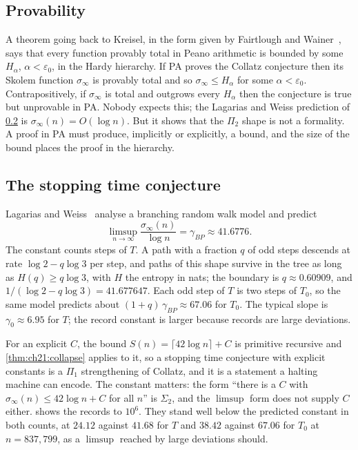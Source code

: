 \subsection{Provability}

A theorem going back to Kreisel, in the form given by Fairtlough and Wainer~\cite{fairtlough1998}, says that every function provably total in Peano arithmetic is bounded by some $H_\alpha$, $\alpha<\varepsilon_0$, in the Hardy hierarchy. If PA proves the Collatz conjecture then its Skolem function $\sigma_\infty$ is provably total and so $\sigma_\infty\le H_\alpha$ for some $\alpha<\varepsilon_0$. Contrapositively, if $\sigma_\infty$ is total and outgrows every $H_\alpha$ then the conjecture is true but unprovable in PA. Nobody expects this; the Lagarias and Weiss prediction of \cref{sec:ch21:stopping} is $\sigma_\infty(n)=O(\log n)$. But it shows that the $\Pi_2$ shape is not a formality. A proof in PA must produce, implicitly or explicitly, a bound, and the size of the bound places the proof in the hierarchy.

\subsection{The stopping time conjecture}\label{sec:ch21:stopping}

Lagarias and Weiss~\cite{lagarias1992} analyse a branching random walk model and predict
\[
\limsup_{n\to\infty}\frac{\sigma_\infty(n)}{\log n}=\gamma_{BP}\approx 41.6776 .
\]
The constant counts steps of $T$. A path with a fraction $q$ of odd steps descends at rate $\log2-q\log3$ per step, and paths of this shape survive in the tree as long as $H(q)\ge q\log3$, with $H$ the entropy in nats; the boundary is $q\approx0.60909$, and $1/(\log2-q\log3)=41.677647$. Each odd step of $T$ is two steps of $T_0$, so the same model predicts about $(1+q)\,\gamma_{BP}\approx67.06$ for $T_0$. The typical slope is $\gamma_0\approx6.95$ for $T$; the record constant is larger because records are large deviations.

For an explicit $C$, the bound $S(n)=\lceil 42\log n\rceil+C$ is primitive recursive and \cref{thm:ch21:collapse} applies to it, so a stopping time conjecture with explicit constants is a $\Pi_1$ strengthening of Collatz, and it is a statement a halting machine can encode. The constant matters: the form ``there is a $C$ with $\sigma_\infty(n)\le42\log n+C$ for all $n$'' is $\Sigma_2$, and the $\limsup$ form does not supply $C$ either.  shows the records to $10^6$. They stand well below the predicted constant in both counts, at $24.12$ against $41.68$ for $T$ and $38.42$ against $67.06$ for $T_0$ at $n=837{,}799$, as a $\limsup$ reached by large deviations should.

